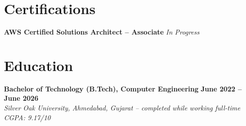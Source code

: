 \documentclass[letterpaper,10pt]{article}
\begin{document}

\section{Certifications}

\textbf{AWS Certified Solutions Architect -- Associate} \hfill \textit{In Progress}


\section{Education}

\textbf{Bachelor of Technology (B.Tech), Computer Engineering}
\hfill \textbf{June 2022 -- June 2026}\\
\textit{Silver Oak University, Ahmedabad, Gujarat -- completed while working full-time}
\hfill \textit{CGPA: 9.17/10}
\end{document}
